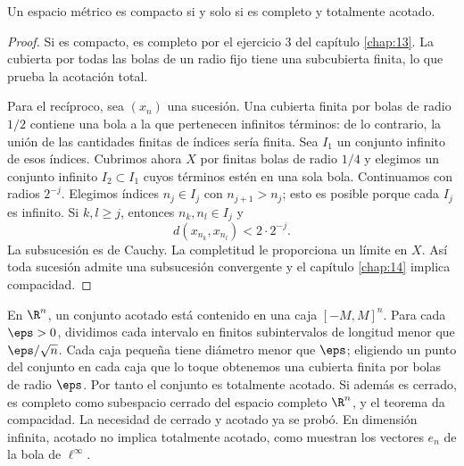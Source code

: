 \begin{teorema}\label{ch15:criterio}
Un espacio métrico es compacto si y solo si es completo y totalmente acotado.
\end{teorema}
\begin{proof}
Si es compacto, es completo por el ejercicio 3 del capítulo \ref{chap:13}. La cubierta por todas las bolas de un radio fijo tiene una subcubierta finita, lo que prueba la acotación total.

Para el recíproco, sea $(x_n)$ una sucesión. Una cubierta finita por bolas de radio $1/2$ contiene una bola a la que pertenecen infinitos términos: de lo contrario, la unión de las cantidades finitas de índices sería finita. Sea $I_1$ un conjunto infinito de esos índices. Cubrimos ahora $X$ por finitas bolas de radio $1/4$ y elegimos un conjunto infinito $I_2\subset I_1$ cuyos términos estén en una sola bola. Continuamos con radios $2^{-j}$. Elegimos índices $n_j\in I_j$ con $n_{j+1}>n_j$; esto es posible porque cada $I_j$ es infinito. Si $k,l\ge j$, entonces $n_k,n_l\in I_j$ y
\[
d(x_{n_k},x_{n_l})<2\cdot2^{-j}.
\]
La subsucesión es de Cauchy. La completitud le proporciona un límite en $X$. Así toda sucesión admite una subsucesión convergente y el capítulo \ref{chap:14} implica compacidad.
\end{proof}

\begin{observacion}
En $\R^n$, un conjunto acotado está contenido en una caja $[-M,M]^n$. Para cada $\eps>0$, dividimos cada intervalo en finitos subintervalos de longitud menor que $\eps/\sqrt n$. Cada caja pequeña tiene diámetro menor que $\eps$; eligiendo un punto del conjunto en cada caja que lo toque obtenemos una cubierta finita por bolas de radio $\eps$. Por tanto el conjunto es totalmente acotado. Si además es cerrado, es completo como subespacio cerrado del espacio completo $\R^n$, y el teorema da compacidad. La necesidad de cerrado y acotado ya se probó. En dimensión infinita, acotado no implica totalmente acotado, como muestran los vectores $e_n$ de la bola de $\ell^\infty$.
\end{observacion}

